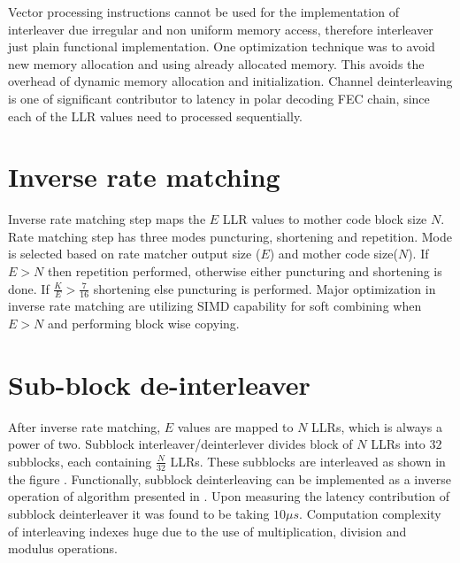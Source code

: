 Vector processing instructions cannot be used for the implementation of interleaver due irregular and non uniform memory access, therefore interleaver just plain functional implementation. One optimization technique was to avoid new memory allocation and using already allocated memory. This avoids the overhead of dynamic memory allocation and initialization. Channel deinterleaving is one of significant contributor to latency in polar decoding FEC chain, since each of the LLR values need to processed sequentially.

\section{Inverse rate matching}
Inverse rate matching step maps the $E$ LLR values to mother code block size $ N $. Rate matching step has three modes puncturing, shortening and repetition. Mode is selected based on rate matcher output size ($E$) and mother code size($ N $). If $E > N$ then repetition performed, otherwise either puncturing and shortening is done. If $ \frac{K}{E} > \frac{7}{16} $ shortening else puncturing is performed. Major optimization in inverse rate matching are utilizing SIMD capability for soft combining when $ E>N $ and performing block wise copying. 
%
%
\section{Sub-block de-interleaver}
After inverse rate matching, $E$ values are mapped to $N$ LLRs, which is always a power of two. Subblock interleaver/deinterlever divides block of $N$ LLRs into $32$ subblocks, each containing $\frac{N}{32}$ LLRs. These subblocks are interleaved as shown in the figure . Functionally, subblock deinterleaving can be implemented as a inverse operation of algorithm presented in \cite{3gpp.38.212}. Upon measuring the latency contribution of subblock deinterleaver it was found to be taking $10 \mu s$. Computation complexity of interleaving indexes huge due to the use of multiplication, division and modulus operations. \newline

